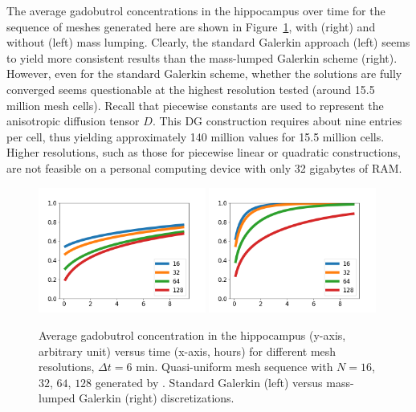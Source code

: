 The average gadobutrol concentrations in the hippocampus over time
for the sequence of meshes generated here are shown in
Figure~\ref{fig:chp6:numerics2}, with (right) and without (left)
mass lumping. Clearly, the standard Galerkin approach (left) seems to
yield more consistent results than the mass-lumped Galerkin scheme
(right). However, even for the standard Galerkin scheme, whether the
solutions are fully converged  seems questionable at the highest
resolution tested (around 15.5 million mesh cells). Recall that piecewise
constants are used to represent the anisotropic diffusion tensor $D$.
This DG construction requires about nine entries per cell, thus yielding
approximately 140 million values for 15.5 million cells. Higher resolutions, such
as those for piecewise linear or quadratic constructions, are not
feasible on a personal computing device with only 32 gigabytes of RAM.
\begin{figure}	
  \includegraphics[width=0.49\textwidth]{./graphics/chp6/tracer_hippocampus_uniform_notlump.png}
  \includegraphics[width=0.49\textwidth]{./graphics/chp6/tracer_hippocampus_uniform_lump.png}
  \caption{Average gadobutrol concentration in the hippocampus (y-axis,
    arbitrary unit) versus time (x-axis, hours) for different mesh
    resolutions, $\Delta t = 6$ min. Quasi-uniform mesh sequence with
    $N=16$, $32$, $64$, $128$ generated by \svmtk. Standard Galerkin (left)
    versus mass-lumped Galerkin (right) discretizations.}
\label{fig:chp6:numerics2}
\end{figure}

